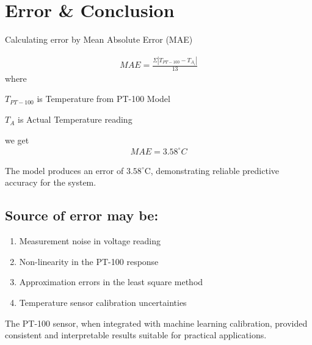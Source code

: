 \documentclass{article}
\begin{document}
\section{Error \& Conclusion}
Calculating error by Mean Absolute Error (MAE)

\begin{align}
    MAE = \frac{\Sigma |T_{PT-100}-T_{A_i}|}{13}
\end{align}
where 

$T_{PT-100}$ is Temperature from PT-100 Model

$T_A$ is Actual Temperature reading

we get 
\begin{align}
MAE = 3.58 ^\circ C
\end{align}

The model produces an error of $3.58^\circ$C, demonstrating reliable predictive accuracy for the system.

\subsection*{Source of error may be:}

\begin{enumerate}
    \item Measurement noise in voltage reading
    \item Non-linearity in the PT-100 response
    \item Approximation errors in the least square method
    \item Temperature sensor calibration uncertainties
\end{enumerate}

The PT-100 sensor, when integrated with machine learning calibration, provided consistent and interpretable results suitable for practical applications.
\end{document}
